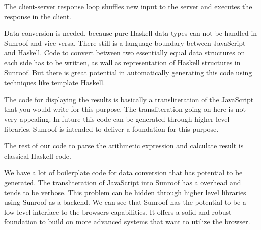 The client-server response loop shuffles new input to the server 
and executes the response in the client.

Data conversion is needed, because pure Haskell data types
can not be handled in Sunroof and vice versa. There still
is a language boundary between JavaScript and Haskell. 
Code to convert between two essentially equal data structures on 
each side has to be written, as wall as representation of Haskell 
structures in Sunroof. But there is great potential in automatically 
generating this code using techniques like template Haskell.

The code for displaying the results is basically a 
transliteration of the JavaScript that you would write for this 
purpose.
The transliteration going on here is not very appealing. 
In future this code can be generated through higher level 
libraries. Sunroof is intended to deliver a foundation for
this purpose.

The rest of our code to parse the arithmetic expression and calculate 
result is classical Haskell code. 

We have a lot of boilerplate code for data conversion
that has potential to be generated.
The transliteration of JavaScript into Sunroof has a overhead and
tends to be verbose. This problem can be hidden through 
higher level libraries using Sunroof as a backend. 
We can see that Sunroof has the potential to be a low level interface
to the browsers capabilities. It offers a solid and robust foundation to build
on more advanced systems that want to utilize the browser.

